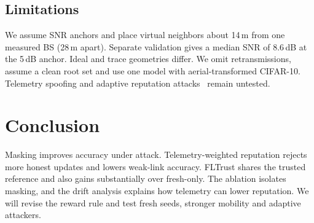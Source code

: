 \documentclass[journal]{IEEEtran}
\begin{document}
\subsection{Limitations}
We assume SNR anchors and place virtual neighbors about 14\,m from one measured
BS (28\,m apart). Separate validation gives a median SNR of 8.6\,dB at the
5\,dB anchor. Ideal and trace geometries differ. We omit retransmissions, assume
a clean root set and use one model with aerial-transformed CIFAR-10. Telemetry
spoofing and adaptive reputation attacks~\cite{liu2026evade} remain untested.

\section{Conclusion}
\label{sec:conclusion}
Masking improves accuracy under attack. Telemetry-weighted reputation rejects
more honest updates and lowers weak-link accuracy. FLTrust shares the trusted
reference and also gains substantially over fresh-only. The ablation isolates
masking, and the drift analysis explains how telemetry can lower reputation. We
will revise the reward rule and test fresh seeds, stronger mobility and adaptive
attackers.



\end{document}
